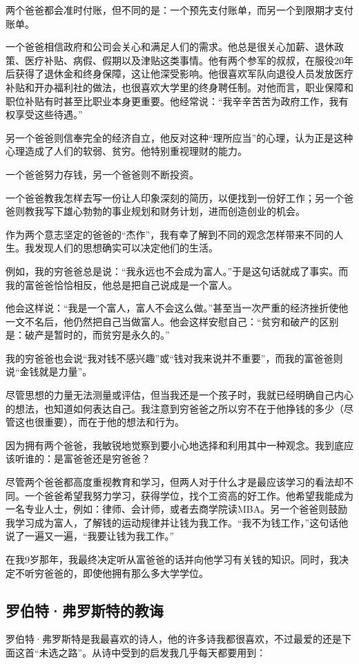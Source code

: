 两个爸爸都会准时付账，但不同的是：一个预先支付账单，而另一个到限期才支付账单。

一个爸爸相信政府和公司会关心和满足人们的需求。他总是很关心加薪、退休政策、医疗补贴、病假、假期以及津贴这类事情。他有两个参军的叔叔，在服役20年后获得了退休金和终身保障，这让他深受影响。他很喜欢军队向退役人员发放医疗补贴和开办福利社的做法，也很喜欢大学里的终身聘任制。对他而言，职业保障和职位补贴有时甚至比职业本身更重要。他经常说：“我辛辛苦苦为政府工作，我有权享受这些待遇。”

另一个爸爸则信奉完全的经济自立，他反对这种“理所应当”的心理，认为正是这种心理造成了人们的软弱、贫穷。他特别重视理财的能力。

一个爸爸努力存钱，另一个爸爸则不断投资。

一个爸爸教我怎样去写一份让人印象深刻的简历，以便找到一份好工作；另一个爸爸则教我写下雄心勃勃的事业规划和财务计划，进而创造创业的机会。

作为两个意志坚定的爸爸的“杰作”，我有幸了解到不同的观念怎样带来不同的人生。我发现人们的思想确实可以决定他们的生活。

例如，我的穷爸爸总是说：“我永远也不会成为富人。”于是这句话就成了事实。而我的富爸爸恰恰相反，他总是把自己说成是一个富人。

他会这样说：“我是一个富人，富人不会这么做。”甚至当一次严重的经济挫折使他一文不名后，他仍然把自己当做富人。他会这样安慰自己：“贫穷和破产的区别是：破产是暂时的，而贫穷是永久的。”

我的穷爸爸也会说“我对钱不感兴趣”或“钱对我来说并不重要”，而我的富爸爸则说“金钱就是力量”。

尽管思想的力量无法测量或评估，但当我还是一个孩子时，我就已经明确自己内心的想法，也知道如何表达自己。我注意到穷爸爸之所以穷不在于他挣钱的多少（尽管这也很重要），而在于他的想法和行为。

因为拥有两个爸爸，我敏锐地觉察到要小心地选择和利用其中一种观念。我到底应该听谁的：是富爸爸还是穷爸爸？

尽管两个爸爸都高度重视教育和学习，但两人对于什么才是最应该学习的看法却不同。一个爸爸希望我努力学习，获得学位，找个工资高的好工作。他希望我能成为一名专业人士，例如：律师、会计师，或者去商学院读MBA。另一个爸爸则鼓励我学习成为富人，了解钱的运动规律并让钱为我工作。“我不为钱工作，”这句话他说了一遍又一遍，“我要让钱为我工作。”

在我9岁那年，我最终决定听从富爸爸的话并向他学习有关钱的知识。同时，我决定不听穷爸爸的，即使他拥有那么多大学学位。

\subsection*{罗伯特·弗罗斯特的教诲}
罗伯特·弗罗斯特是我最喜欢的诗人，他的许多诗我都很喜欢，不过最爱的还是下面这首“未选之路”。从诗中受到的启发我几乎每天都要用到：

